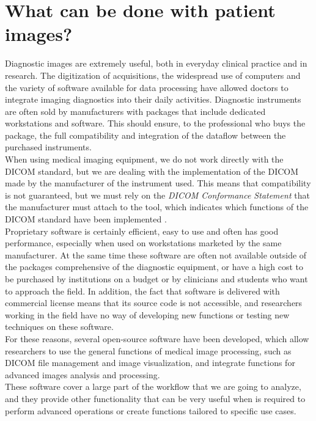 \section{What can be done with patient images?}
Diagnostic images are extremely useful, both in everyday clinical practice and in research.
The digitization of acquisitions, the widespread use of computers and the variety of software available for data processing have allowed doctors to integrate imaging diagnostics into their daily activities. Diagnostic instruments are often sold by manufacturers with packages that include dedicated workstations and software. This should ensure, to the professional who buys the package, the full compatibility and integration of the dataflow between the purchased instruments. \\ 
When using medical imaging equipment, we do not work directly with the DICOM standard, but we are dealing with the implementation of the DICOM made by the manufacturer of the instrument used. This means that compatibility is not guaranteed, but we must rely on the \emph{DICOM Conformance Statement} that the manufacturer must attach to the tool, which indicates which functions of the DICOM standard have been implemented \parencite{Reference25}. \\
Proprietary software is certainly efficient, easy to use and often has good performance, especially when used on workstations marketed by the same manufacturer. At the same time these software are often not available outside of the packages comprehensive of the diagnostic equipment, or have a high cost to be purchased by institutions on a budget or by clinicians and students who want to approach the field. In addition, the fact that software is delivered with commercial license means that its source code is not accessible, and researchers working in the field have no way of developing new functions or testing new techniques on these software. \\
For these reasons, several open-source software have been developed, which allow researchers to use the general functions of medical image processing, such as DICOM file management and image visualization, and integrate functions for advanced images analysis and processing. \\
These software cover a large part of the workflow that we are going to analyze, and they provide other functionality that can be very useful when is required to perform advanced operations or create functions tailored to specific use cases.


